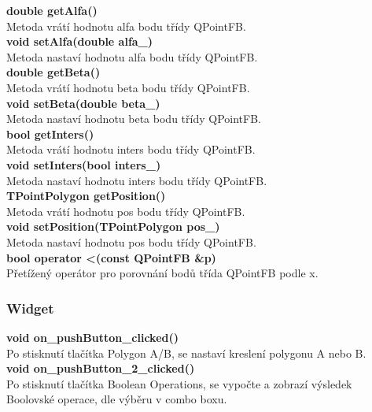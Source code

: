 \documentclass[a4paper, 12pt]{article}
\begin{document}
\textbf{double getAlfa()}\\
Metoda vrátí hodnotu alfa bodu třídy QPointFB.\\

\textbf{void setAlfa(double alfa\_)}\\
Metoda nastaví hodnotu alfa bodu třídy QPointFB.\\

\textbf{double getBeta()}\\
Metoda vrátí hodnotu beta bodu třídy QPointFB.\\

\textbf{void setBeta(double beta\_)}\\
Metoda nastaví hodnotu beta bodu třídy QPointFB.\\

\textbf{bool getInters()}\\
Metoda vrátí hodnotu inters bodu třídy QPointFB.\\

\textbf{void setInters(bool inters\_)}\\
Metoda nastaví hodnotu inters bodu třídy QPointFB.\\

\textbf{TPointPolygon getPosition()}\\
Metoda vrátí hodnotu pos bodu třídy QPointFB.\\

\textbf{void setPosition(TPointPolygon pos\_)}\\
Metoda nastaví hodnotu pos bodu třídy QPointFB.\\

\textbf{bool operator \textless (const QPointFB \&p)}\\
Přetížený operátor pro porovnání bodů třída QPointFB podle x.\\

\subsubsection{Widget}

\textbf{void on\_pushButton\_clicked()}\\
Po stisknutí tlačítka Polygon A/B, se nastaví kreslení polygonu A nebo B.\\

\textbf{void on\_pushButton\_2\_clicked()}\\
Po stisknutí tlačítka Boolean Operations, se vypočte a zobrazí výsledek Boolovské operace, dle výběru v combo boxu.\\
\end{document}
